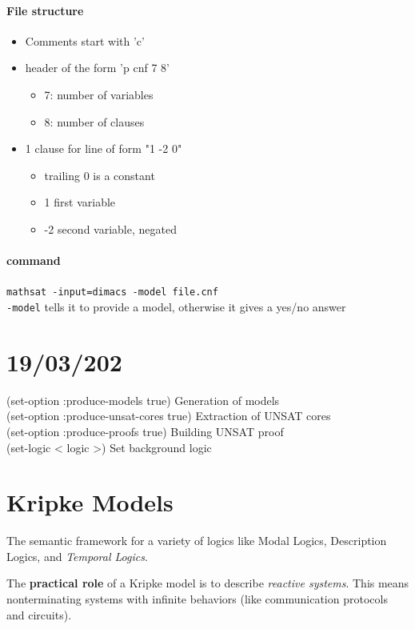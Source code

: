 \documentclass{article}
\begin{document}
\paragraph{File structure}
\begin{itemize}
    \item Comments start with 'c'
    \item header of the form 'p cnf 7 8'
        \begin{itemize}
            \item 7: number of variables
            \item 8: number of clauses
        \end{itemize}
    \item 1 clause for line of form "1 -2 0"
        \begin{itemize}
            \item trailing 0 is a constant
            \item 1 first variable
            \item -2 second variable, negated
        \end{itemize}
\end{itemize}

\paragraph{command}
\texttt{mathsat -input=dimacs -model file.cnf}\\
\texttt{-model} tells it to provide a model, otherwise it gives a yes/no answer

\section{19/03/202}
(set-option :produce-models true) Generation of models \\
(set-option :produce-unsat-cores true) Extraction of UNSAT cores \\
(set-option :produce-proofs true) Building UNSAT proof \\
(set-logic < logic >) Set background logic \\

\section{Kripke Models}
The semantic framework for a variety of logics like Modal Logics, Description Logics, and \textit{Temporal Logics}.

The \textbf{practical role} of a Kripke model is to describe \textit{reactive systems}. This means nonterminating systems with infinite behaviors (like communication protocols and circuits).
\end{document}
